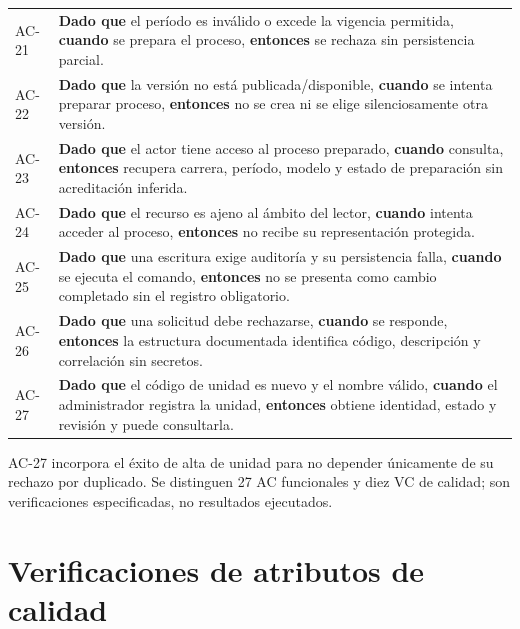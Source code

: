 \documentclass[12pt,a4paper]{report}
\begin{document}
{\begin{longtable}[]{@{}
  >{\raggedright\arraybackslash}p{}
  >{\raggedright\arraybackslash}p{}@{}}
AC-21 & \textbf{Dado que} el período es inválido o excede la vigencia
permitida, \textbf{cuando} se prepara el proceso, \textbf{entonces} se
rechaza sin persistencia parcial. \\
AC-22 & \textbf{Dado que} la versión no está publicada/disponible,
\textbf{cuando} se intenta preparar proceso, \textbf{entonces} no se
crea ni se elige silenciosamente otra versión. \\
AC-23 & \textbf{Dado que} el actor tiene acceso al proceso preparado,
\textbf{cuando} consulta, \textbf{entonces} recupera carrera, período,
modelo y estado de preparación sin acreditación inferida. \\
AC-24 & \textbf{Dado que} el recurso es ajeno al ámbito del lector,
\textbf{cuando} intenta acceder al proceso, \textbf{entonces} no recibe
su representación protegida. \\
AC-25 & \textbf{Dado que} una escritura exige auditoría y su
persistencia falla, \textbf{cuando} se ejecuta el comando,
\textbf{entonces} no se presenta como cambio completado sin el registro
obligatorio. \\
AC-26 & \textbf{Dado que} una solicitud debe rechazarse,
\textbf{cuando} se responde, \textbf{entonces} la estructura documentada
identifica código, descripción y correlación sin secretos. \\
AC-27 & \textbf{Dado que} el código de unidad es nuevo y el nombre
válido, \textbf{cuando} el administrador registra la unidad,
\textbf{entonces} obtiene identidad, estado y revisión y puede
consultarla. \\
\end{longtable}
}

AC-27 incorpora el éxito de alta de unidad para no depender
únicamente de su rechazo por duplicado. Se distinguen 27 AC funcionales
y diez VC de calidad; son verificaciones especificadas, no resultados
ejecutados.

\section{Verificaciones de atributos de
calidad}\label{dossier-verificaciones-de-atributos-de-calidad}
\end{document}
